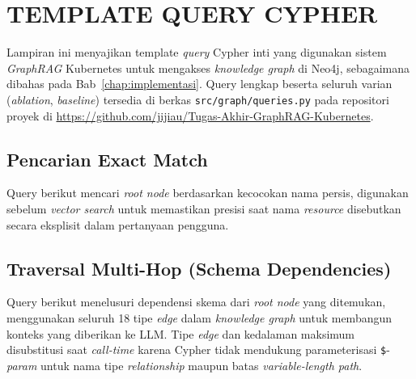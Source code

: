\cleardoublepage
\chapter{TEMPLATE QUERY CYPHER}

Lampiran ini menyajikan template \textit{query} Cypher inti yang digunakan sistem \textit{GraphRAG} Kubernetes untuk mengakses \textit{knowledge graph} di Neo4j, sebagaimana dibahas pada Bab~\ref{chap:implementasi}. Query lengkap beserta seluruh varian (\textit{ablation}, \textit{baseline}) tersedia di berkas \texttt{src/graph/queries.py} pada repositori proyek di \url{https://github.com/jijiau/Tugas-Akhir-GraphRAG-Kubernetes}.

\section{Pencarian Exact Match}

Query berikut mencari \textit{root node} berdasarkan kecocokan nama persis, digunakan sebelum \textit{vector search} untuk memastikan presisi saat nama \textit{resource} disebutkan secara eksplisit dalam pertanyaan pengguna.



\section{Traversal Multi-Hop (Schema Dependencies)}

Query berikut menelusuri dependensi skema dari \textit{root node} yang ditemukan, menggunakan seluruh 18 tipe \textit{edge} dalam \textit{knowledge graph} untuk membangun konteks yang diberikan ke LLM. Tipe \textit{edge} dan kedalaman maksimum disubstitusi saat \textit{call-time} karena Cypher tidak mendukung parameterisasi \texttt{\$}-\textit{param} untuk nama tipe \textit{relationship} maupun batas \textit{variable-length path}.



